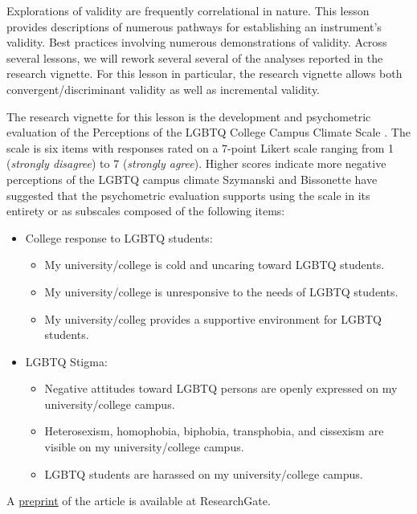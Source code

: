 \documentclass[
  english,
]{book}
\providecommand{\tightlist}{%
  \setlength{\itemsep}{0pt}\setlength{\parskip}{0pt}}
\begin{document}
Explorations of validity are frequently correlational in nature. This lesson provides descriptions of numerous pathways for establishing an instrument's validity. Best practices involving numerous demonstrations of validity. Across several lessons, we will rework several several of the analyses reported in the research vignette. For this lesson in particular, the research vignette allows both convergent/discriminant validity as well as incremental validity.

The research vignette for this lesson is the development and psychometric evaluation of the Perceptions of the LGBTQ College Campus Climate Scale \citep{szymanski_perceptions_2020}. The scale is six items with responses rated on a 7-point Likert scale ranging from 1 (\emph{strongly disagree}) to 7 (\emph{strongly agree}). Higher scores indicate more negative perceptions of the LGBTQ campus climate Szymanski and Bissonette have suggested that the psychometric evaluation supports using the scale in its entirety or as subscales composed of the following items:

\begin{itemize}
\tightlist
\item
  College response to LGBTQ students:

  \begin{itemize}
  \tightlist
  \item
    My university/college is cold and uncaring toward LGBTQ students.
  \item
    My university/college is unresponsive to the needs of LGBTQ students.
  \item
    My university/colleg provides a supportive environment for LGBTQ students.
  \end{itemize}
\item
  LGBTQ Stigma:

  \begin{itemize}
  \tightlist
  \item
    Negative attitudes toward LGBTQ persons are openly expressed on my university/college campus.
  \item
    Heterosexism, homophobia, biphobia, transphobia, and cissexism are visible on my university/college campus.
  \item
    LGBTQ students are harassed on my university/college campus.
  \end{itemize}
\end{itemize}

A \href{https://www.researchgate.net/publication/332062781_Perceptions_of_the_LGBTQ_College_Campus_Climate_Scale_Development_and_Psychometric_Evaluation/link/5ca0bef945851506d7377da7/download}{preprint} of the article is available at ResearchGate.
\end{document}
